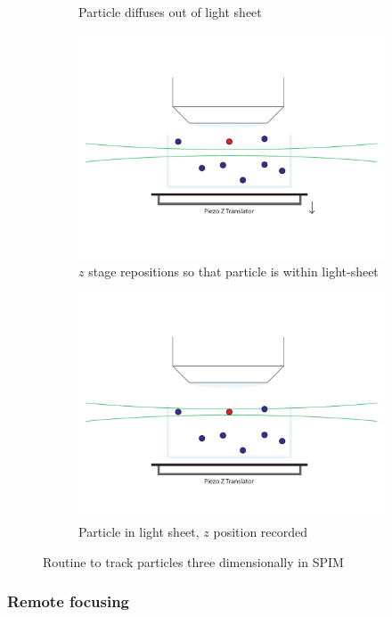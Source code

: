 \begin{figure}
\begin{subfigure}[b]{0.35\linewidth}
		\caption{Particle diffuses out of light sheet}
		\label{fig:SPIMSPT2}
	\end{subfigure}
	\begin{subfigure}[b]{0.35\linewidth}
		\centering
		\includegraphics[width=0.8\linewidth]{Chapters/spt/Figs/PDF/tracking/3_piezo_track}
		\caption{\(z\) stage repositions so that particle is within light-sheet}
		\label{fig:SPIMSPT3}
	\end{subfigure}
	\begin{subfigure}[b]{0.35\linewidth}
		\centering
		\includegraphics[width=0.8\linewidth]{Chapters/spt/Figs/PDF/tracking/4_piezo_track}
		\caption{Particle in light sheet, \(z\) position recorded}
		\label{fig:SPIMSPT4}
	\end{subfigure}
	\caption{Routine to track particles three dimensionally in SPIM}
	\label{fig:SPIMSPT}
\end{figure}

\subsubsection{Remote focusing}

